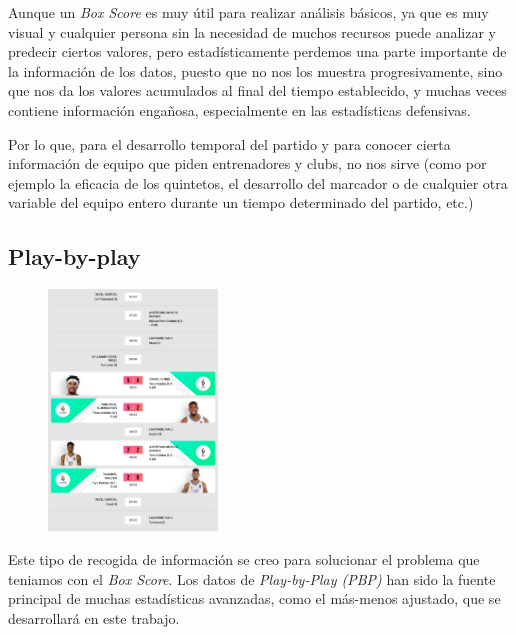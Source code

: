 \documentclass[paper=a4, fontsize=9pt]{article}
\begin{document}
Aunque un \emph{Box Score} es muy útil para realizar análisis básicos, ya que es muy visual y cualquier persona sin la necesidad de muchos recursos puede analizar y predecir ciertos valores, pero estadísticamente perdemos una parte importante de la información de los datos, puesto que no nos los muestra progresivamente, sino que nos da los valores acumulados al final del tiempo establecido, y muchas veces contiene información engañosa, especialmente en las estadísticas defensivas.

Por lo que, para el desarrollo temporal del partido y para conocer cierta información de equipo que piden entrenadores y clubs, no nos sirve (como por ejemplo la eficacia de los quintetos, el desarrollo del marcador o de cualquier otra variable del equipo entero durante un tiempo determinado del partido, etc.)



\subsection{Play-by-play}

\begin{figure}
    \centering
    \includegraphics[width=0.4\textwidth]{imagenes/PBP_RM.png}
    \captionsetup{width=.9\linewidth}
    \label{fig:PBP_RM}
\end{figure}

Este tipo de recogida de información se creo para solucionar el problema que teniamos con el \emph{Box Score}. Los datos de \emph{Play-by-Play (PBP)} han sido la fuente principal de muchas estadísticas avanzadas, como el más-menos ajustado, que se desarrollará en este trabajo.
\end{document}
